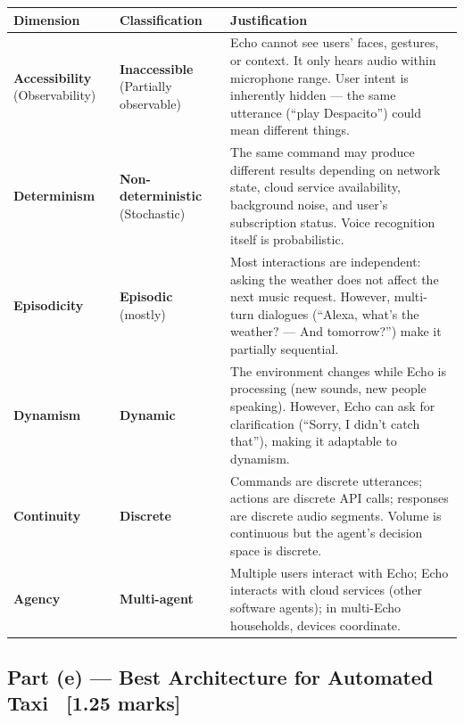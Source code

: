 \documentclass[12pt, a4paper]{article}
\begin{document}
\begin{center}
\renewcommand{\arraystretch}{1.4}
\begin{tabular}{l|l|p{8cm}}
\toprule
\textbf{Dimension} & \textbf{Classification} & \textbf{Justification} \\
\midrule
\textbf{Accessibility} (Observability) & \textbf{Inaccessible} (Partially observable) & Echo cannot see users' faces, gestures, or context. It only hears audio within microphone range. User intent is inherently hidden — the same utterance (``play Despacito'') could mean different things. \\
\midrule
\textbf{Determinism} & \textbf{Non-deterministic} (Stochastic) & The same command may produce different results depending on network state, cloud service availability, background noise, and user's subscription status. Voice recognition itself is probabilistic. \\
\midrule
\textbf{Episodicity} & \textbf{Episodic} (mostly) & Most interactions are independent: asking the weather does not affect the next music request. However, multi-turn dialogues (``Alexa, what's the weather? — And tomorrow?'') make it partially sequential. \\
\midrule
\textbf{Dynamism} & \textbf{Dynamic} & The environment changes while Echo is processing (new sounds, new people speaking). However, Echo can ask for clarification (``Sorry, I didn't catch that''), making it adaptable to dynamism. \\
\midrule
\textbf{Continuity} & \textbf{Discrete} & Commands are discrete utterances; actions are discrete API calls; responses are discrete audio segments. Volume is continuous but the agent's decision space is discrete. \\
\midrule
\textbf{Agency} & \textbf{Multi-agent} & Multiple users interact with Echo; Echo interacts with cloud services (other software agents); in multi-Echo households, devices coordinate. \\
\bottomrule
\end{tabular}
\end{center}

\subsection{Part (e) — Best Architecture for Automated Taxi \ [1.25 marks]}
\end{document}
